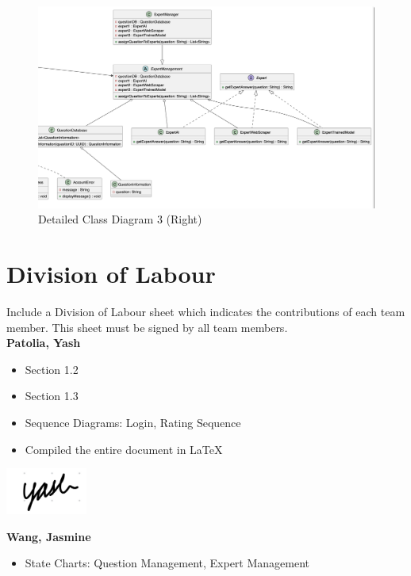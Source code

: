 \documentclass[]{article}
\numberwithin{figure}{section}
\begin{document}
\begin{figure}[h]
    \centering
    \includegraphics[width=1\textwidth]{diagrams/right.png} %
    \caption{Detailed Class Diagram 3 (Right)\\}
\end{figure}

\clearpage
\appendix
\section{Division of Labour}
\label{sec:division_of_labour}
Include a Division of Labour sheet which indicates the contributions of each team member. This sheet must be signed by all team members.\\

\noindent
\textbf{Patolia, Yash}
\begin{itemize}
	\item Section 1.2
	\item Section 1.3
	\item Sequence Diagrams: Login, Rating Sequence
	\item Compiled the entire document in LaTeX
\end{itemize}

\includegraphics[width=0.2\textwidth]{signatures/yash.png} %

\noindent
\textbf{Wang, Jasmine}
\begin{itemize}
	\item State Charts: Question Management, Expert Management
\end{itemize}
\end{document}
